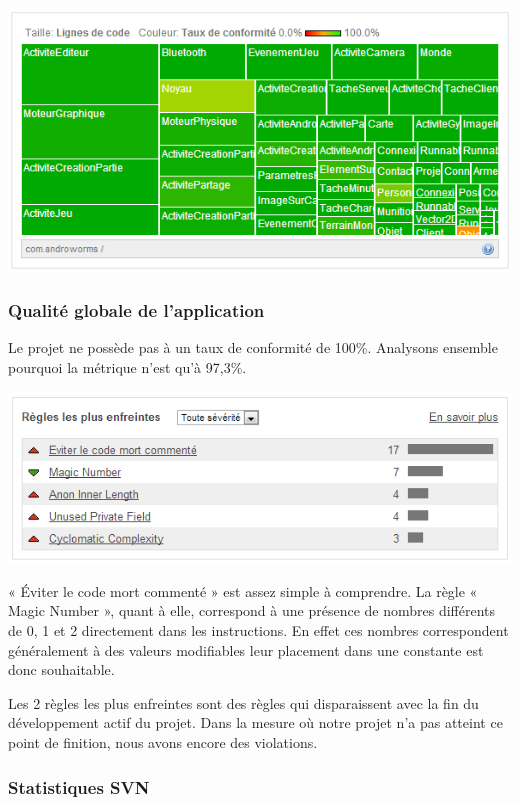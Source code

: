 \documentclass{report}
\begin{document}
\begin{center}
\includegraphics[scale=0.8]{images/state2}
\end{center}

\subsubsection{Qualité globale de l’application}

Le projet ne possède pas à un taux de conformité de 100\%. Analysons
ensemble pourquoi la  métrique n’est qu’à 97,3\%.


\includegraphics[scale=0.75]{images/rules}

« Éviter le code mort commenté » est assez simple à comprendre. La
règle « Magic Number », quant à elle, correspond à une présence de
nombres différents de 0, 1 et 2 directement dans les instructions. En
effet ces nombres correspondent généralement à des valeurs modifiables
leur placement dans une constante est donc souhaitable.

Les 2 règles les plus enfreintes sont des règles qui disparaissent avec
la fin du développement actif du projet. Dans la mesure où notre projet
n’a pas atteint ce point de finition, nous avons encore des violations.

\subsubsection{Statistiques SVN}
\end{document}

